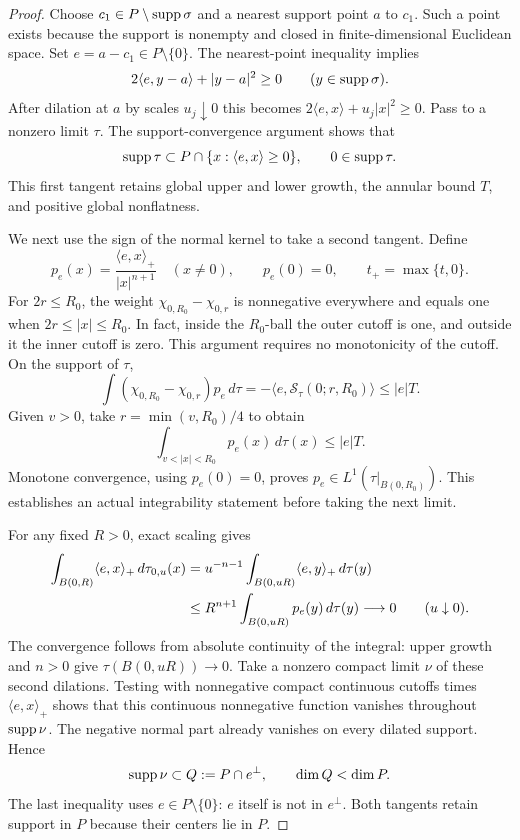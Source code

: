 \begin{proof}
Choose $c_1\in P\setminus\operatorname{supp}\sigma$ and a nearest support
point $a$ to $c_1$.  Such a point exists because the support is
nonempty and closed in finite-dimensional Euclidean space.
Set $e=a-c_1\in P\setminus\{0\}$.  The nearest-point inequality
implies
\[
 2\langle e,y-a\rangle+|y-a|^2\geq0
       \qquad(y\in\operatorname{supp}\sigma).
\]
After dilation at $a$ by scales $u_j\downarrow0$ this becomes
$2\langle e,x\rangle+u_j|x|^2\geq0$.
Pass to a nonzero limit $\tau$.  The support-convergence argument
shows that
\[
 \operatorname{supp}\tau\subset P\cap\{x:\langle e,x\rangle\geq0\},
 \qquad 0\in\operatorname{supp}\tau.
\]
This first tangent retains global upper and lower growth,
the annular bound $T$, and positive global nonflatness.

We next use the sign of the normal kernel to take a second
tangent.  Define
\[
 p_e(x)=\frac{\langle e,x\rangle_+}{|x|^{n+1}}
 \quad(x\ne0),\qquad p_e(0)=0,
 \qquad t_+=\max\{t,0\}.
\]
For $2r\leq R_0$, the weight
$\chi_{0,R_0}-\chi_{0,r}$ is nonnegative everywhere and equals
one when $2r\leq|x|\leq R_0$.  In fact, inside the $R_0$-ball
the outer cutoff is one, and outside it the inner cutoff is zero.
This argument requires no monotonicity of the cutoff.
On the support of $\tau$,
\[
 \int(\chi_{0,R_0}-\chi_{0,r})p_e\,d\tau
       =-\langle e,\mathcal S_\tau(0;r,R_0)\rangle
       \leq |e|T.
\]
Given $v>0$, take $r=\min(v,R_0)/4$ to obtain
\[
 \int_{v<|x|<R_0}p_e(x)\,d\tau(x)\leq |e|T.
\]
Monotone convergence, using $p_e(0)=0$, proves
$p_e\in L^1(\tau|_{B(0,R_0)})$.  This establishes an actual
integrability statement before taking the next limit.

For any fixed $R>0$, exact scaling gives
\begin{align}\label{eq:vanishing-normal-moment}
 \int_{B(0,R)}\langle e,x\rangle_+\,d\tau_{0,u}(x)
  &=u^{-n-1}\int_{B(0,uR)}\langle e,y\rangle_+\,d\tau(y)\notag\\
  &\leq R^{n+1}\int_{B(0,uR)}p_e(y)\,d\tau(y)
       \longrightarrow0 \qquad(u\downarrow0).
\end{align}
The convergence follows from absolute continuity of the integral:
upper growth and $n>0$ give $\tau(B(0,uR))\to0$.
Take a nonzero compact limit $\nu$ of these second dilations.
Testing with nonnegative compact continuous cutoffs times
$\langle e,x\rangle_+$ shows that this continuous nonnegative
function vanishes throughout $\operatorname{supp}\nu$.
The negative normal part already vanishes on every dilated
support.  Hence
\[
 \operatorname{supp}\nu\subset Q:=P\cap e^\perp,
 \qquad \dim Q<\dim P.
\]
The last inequality uses $e\in P\setminus\{0\}$:
$e$ itself is not in $e^\perp$.  Both tangents retain support
in $P$ because their centers lie in $P$.


\end{proof}
